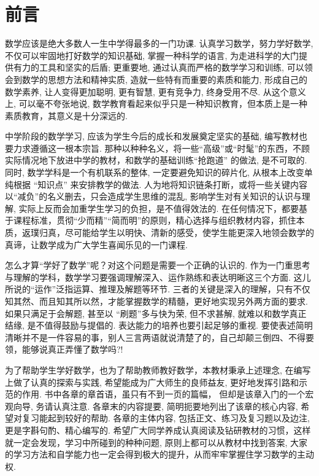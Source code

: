 \documentclass[10pt]{article}
\begin{document}
\section*{前言}

数学应该是绝大多数人一生中学得最多的一门功课. 认真学习数学，努力学好数学, 不仅可以牢固地打好数学的知识基础, 掌握一种科学的语言, 为走进科学的大门提供有力的工具和坚实的后盾; 更重要地, 通过认真而严格的数学学习和训练, 可以领会到数学的思想方法和精神实质, 造就一些特有而重要的素质和能力, 形成自己的数学素养, 让人变得更加聪明, 更有智慧, 更有竞争力, 终身受用不尽. 从这个意义上, 可以毫不夸张地说, 数学教育看起来似乎只是一种知识教育，但本质上是一种素质教育，其意义是十分深远的.

中学阶段的数学学习, 应该为学生今后的成长和发展奠定坚实的基础, 编写教材也要力求遵循这一根本宗旨. 那种以种种名义，将一些“高级”或“时髦”的东西，不顾实际情况地下放进中学的教材，和数学的基础训练“抢跑道” 的做法, 是不可取的. 同时, 数学学科是一个有机联系的整体, 一定要避免知识的碎片化, 从根本上改变单纯根据 “知识点” 来安排教学的做法. 人为地将知识链条打断，或将一些关键内容以“减负”的名义删去，只会造成学生思维的混乱, 影响学生对有关知识的认识与理解, 实际上反而会加重学生学习的负担，是不值得效法的. 在任何情况下，都要基于课程标准，贯彻“少而精”“简而明”的原则，精心选择与组织教材内容，抓住本质，返璞归真，尽可能给学生以明快、清新的感受，使学生能更深入地领会数学的真谛，让数学成为广大学生喜闻乐见的一门课程.

怎么才算“学好了数学”呢？对这个问题是需要一个正确的认识的. 作为一门重思考与理解的学科，数学学习要强调理解深入、运作熟练和表达明晰这三个方面. 这儿所说的“运作”泛指运算、推理及解题等环节. 三者的关键是深入的理解，只有不仅知其然、而且知其所以然，才能掌握数学的精髓，更好地实现另外两方面的要求. 如果只满足于会解题, 甚至以 “刷题”多与快为荣, 但不求甚解, 就难以和数学真正结缘, 是不值得鼓励与提倡的. 表达能力的培养也要引起足够的重视. 要使表述简明清晰并不是一件容易的事，别人三言两语就说清楚了的，自己却颠三倒四、不得要领，能够说真正弄懂了数学吗?!

为了帮助学生学好数学，也为了帮助教师教好数学，本教材秉承上述理念, 在编写上做了认真的探索与实践, 希望能成为广大师生的良师益友, 更好地发挥引路和示范的作用. 书中各章的章首语，虽只有不到一页的篇幅， 但却是该章入门的一个宏观向导, 务请认真注意. 各章末的内容提要, 简明扼要地列出了该章的核心内容, 希望对复习能起到较好的帮助. 各章的主体内容, 包括正文、练习及复习题以及边注, 更是字斟句酌、精心编写的. 希望广大同学养成认真阅读及钻研教材的习惯，这样就一定会发现，学习中所碰到的种种问题, 原则上都可以从教材中找到答案, 大家的学习方法和自学能力也一定会得到极大的提升，从而牢牢掌握住学习数学的主动权.
\end{document}
